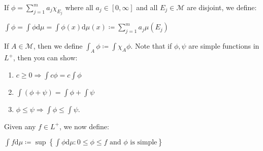 \documentclass{book}
\newcommand{\hTwo}{%
\color{MidnightBlue}%
   \fontsize{13}{15}\selectfont%
}
\newcommand{\df}{\mathrm{d}}
\newcommand{\retTwo}{\hfill\bigbreak}
\begin{document}
If $\phi = \sum_{j=1}^m a_j\chi_{E_j}$ where all $a_j \in [0, \infty]$ and all $E_j \in \mathcal{M}$ are disjoint, we define:

{\centering $\int \phi = \int \phi \df \mu = \int \phi(x) \df \mu(x) \coloneq \sum\limits_{j=1}^m a_j \mu(E_j)$ \retTwo\par}

If $A \in \mathcal{M}$, then we define $\int_A \phi \coloneq \int \chi_A \phi$. Note that if $\phi, \psi$ are simple functions in $L^+$, then you can show:

\begin{enumerate}\hTwo
	\item $c \geq 0 \Longrightarrow \int c \phi = c \int \phi$
\item $\int(\phi + \psi) = \int \phi + \int \psi$
\item $\phi \leq \psi \Longrightarrow \int \phi \leq \int \psi$.
\end{enumerate}

\newpage

Given any $f \in L^+$, we now define:

{\centering$\int f \df \mu \coloneq \sup \left\{\int \phi \df \mu : 0 \leq \phi \leq f \text{ and } \phi \text{ is simple}\right\}$\retTwo\par}



\newpage






















\end{document}
